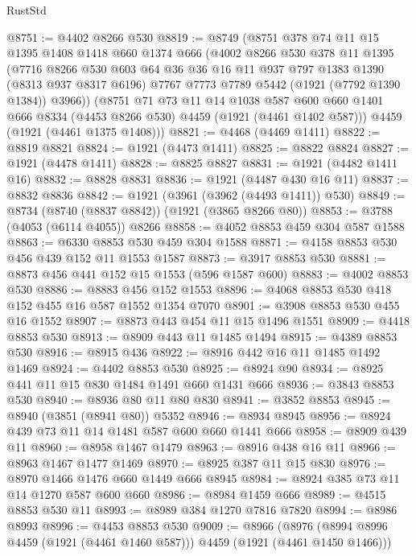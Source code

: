 \begin{lexlean}{RustStd}
\begin{coremodule}
@8751 := @4402 @8266 @530
@8819 := @8749
    (@8751
      @378
      @74
      @11
      @15
      @1395
      @1408
      @1418
      @660
      @1374
      @666
      (@4002
        @8266
        @530
        @378
        @11
        @1395
        (@7716
          @8266
          @530
          @603
          @64
          @36
          @36
          @16
          @11
          @937
          @797
          @1383
          @1390
          (@8313 @937 @8317 @6196)
          @7767
          @7773
          @7789
          @5442
          (@1921 (@7792 @1390 @1384))
          @3966))
      (@8751
        @71
        @73
        @11
        @14
        @1038
        @587
        @600
        @660
        @1401
        @666
        @8334
        (@4453 @8266 @530)
        @4459
        (@1921 (@4461 @1402 @587)))
      @4459
      (@1921 (@4461 @1375 @1408)))
@8821 := @4468 (@4469 @1411)
@8822 := @8819 @8821
@8824 := @1921 (@4473 @1411)
@8825 := @8822 @8824
@8827 := @1921 (@4478 @1411)
@8828 := @8825 @8827
@8831 := @1921 (@4482 @1411 @16)
@8832 := @8828 @8831
@8836 := @1921 (@4487 @430 @16 @11)
@8837 := @8832 @8836
@8842 := @1921 (@3961 (@3962 (@4493 @1411)) @530)
@8849 := @8734 (@8740 (@8837 @8842)) (@1921 (@3865 @8266 @80))
@8853 := @3788 (@4053 (@6114 @4055)) @8266
@8858 := @4052 @8853 @459 @304 @587 @1588
@8863 := @6330 @8853 @530 @459 @304 @1588
@8871 := @4158 @8853 @530 @456 @439 @152 @11 @1553 @1587
@8873 := @3917 @8853 @530
@8881 := @8873 @456 @441 @152 @15 @1553 (@596 @1587 @600)
@8883 := @4002 @8853 @530
@8886 := @8883 @456 @152 @1553
@8896 := @4068 @8853 @530 @418 @152 @455 @16 @587 @1552 @1354 @7070
@8901 := @3908 @8853 @530 @455 @16 @1552
@8907 := @8873 @443 @454 @11 @15 @1496 @1551
@8909 := @4418 @8853 @530
@8913 := @8909 @443 @11 @1485 @1494
@8915 := @4389 @8853 @530
@8916 := @8915 @436
@8922 := @8916 @442 @16 @11 @1485 @1492 @1469
@8924 := @4402 @8853 @530
@8925 := @8924 @90
@8934 := @8925 @441 @11 @15 @830 @1484 @1491 @660 @1431 @666
@8936 := @3843 @8853 @530
@8940 := @8936 @80 @11 @80 @830
@8941 := @3852 @8853
@8945 := @8940 (@3851 (@8941 @80)) @5352
@8946 := @8934 @8945
@8956 := @8924 @439 @73 @11 @14 @1481 @587 @600 @660 @1441 @666
@8958 := @8909 @439 @11
@8960 := @8958 @1467 @1479
@8963 := @8916 @438 @16 @11
@8966 := @8963 @1467 @1477 @1469
@8970 := @8925 @387 @11 @15 @830
@8976 := @8970 @1466 @1476 @660 @1449 @666 @8945
@8984 := @8924 @385 @73 @11 @14 @1270 @587 @600 @660
@8986 := @8984 @1459 @666
@8989 := @4515 @8853 @530 @11
@8993 := @8989 @384 @1270 @7816 @7820
@8994 := @8986 @8993
@8996 := @4453 @8853 @530
@9009 := @8966
    (@8976 (@8994 @8996 @4459 (@1921 (@4461 @1460 @587))) @4459 (@1921 (@4461 @1450 @1466)))

\end{coremodule}
\end{lexlean}
